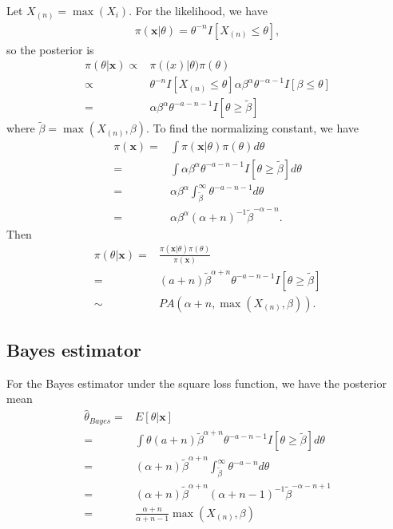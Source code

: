 \documentclass{article}
\begin{document}
Let $X_{(n)} = \max(X_i)$.
For the likelihood, we have
\begin{align*}
  \pi(\bm{x} | \theta) = \theta^{-n} I[X_{(n)} \leq \theta],
\end{align*}
so the posterior is
\begin{align*}
  \pi(\theta | \bm{x})
  \propto & \pi(\bm(x) | \theta) \pi(\theta) \\ 
  \propto & \theta^{-n} I[X_{(n)} \leq \theta] \alpha \beta^\alpha \theta^{-\alpha-1} I[\beta \leq \theta]\\
  = & \alpha \beta^\alpha \theta^{-a-n-1} I[\theta \geq \tilde{\beta}]
\end{align*}
where $\tilde{\beta} = \max(X_{(n)}, \beta)$.
To find the normalizing constant, we have
\begin{align*}
  \pi(\bm{x}) = &  \int \pi(\bm{x} | \theta) \pi(\theta) d\theta \\
  = & \int \alpha \beta^\alpha \theta^{-a-n-1} I[\theta \geq \tilde{\beta}] d\theta \\
  = & \alpha \beta^\alpha \int_{\tilde{\beta}}^\infty \theta^{-a-n-1} d\theta \\
  = & \alpha \beta^\alpha (\alpha+n)^{-1} \tilde{\beta}^{-\alpha-n}.
\end{align*}
Then
\begin{align*}
  \pi(\theta | \bm{x})
  = & \frac{\pi(\bm{x}|\theta) \pi(\theta)}{\pi(\bm{x})} \\
  = & (a+n) \tilde{\beta}^{\alpha+n} \theta^{-a-n-1} I[\theta \geq \tilde{\beta}] \\
  \sim & PA(\alpha+n, \max(X_{(n)}, \beta)).
\end{align*}

\subsection{Bayes estimator}

For the Bayes estimator under the square loss function,
we have the posterior mean
\begin{align*}
  \hat{\theta}_{Bayes}
  = & E[\theta | \bm{x}] \\
  = & \int \theta (a+n) \tilde{\beta}^{\alpha+n} \theta^{-a-n-1} I[\theta \geq \tilde{\beta}] d\theta \\
  = & (\alpha+n) \tilde{\beta}^{\alpha+n} \int_{\tilde{\beta}}^\infty \theta^{-a-n} d\theta \\
  = & (\alpha+n) \tilde{\beta}^{\alpha+n} (\alpha+n-1)^{-1} \tilde{\beta}^{-\alpha-n+1} \\
  = & \frac{\alpha+n}{\alpha+n-1} \max(X_{(n)}, \beta)
\end{align*}
\end{document}
